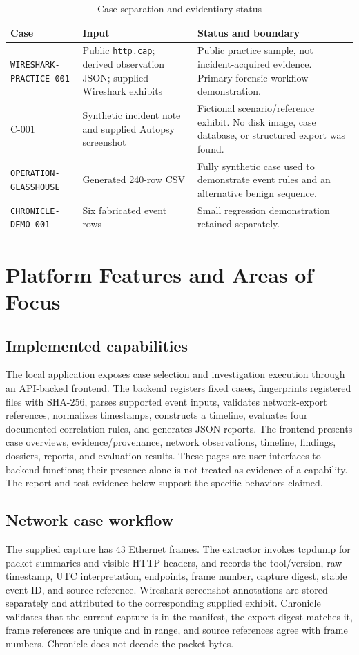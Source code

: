 \documentclass[12pt,a4paper]{report}
\newcommand{\caseid}[1]{\texttt{#1}}
\begin{document}
\begin{table}[H]
\centering
\caption{Case separation and evidentiary status}
\begin{tabularx}{\textwidth}{p{}p{}Y}
\toprule
Case & Input & Status and boundary\\
\midrule
\caseid{WIRESHARK-PRACTICE-001} & Public \texttt{http.cap}; derived observation JSON; supplied Wireshark exhibits & Public practice sample, not incident-acquired evidence. Primary forensic workflow demonstration.\\
C-001 & Synthetic incident note and supplied Autopsy screenshot & Fictional scenario/reference exhibit. No disk image, case database, or structured export was found.\\
\caseid{OPERATION-GLASSHOUSE} & Generated 240-row CSV & Fully synthetic case used to demonstrate event rules and an alternative benign sequence.\\
\caseid{CHRONICLE-DEMO-001} & Six fabricated event rows & Small regression demonstration retained separately.\\
\bottomrule
\end{tabularx}
\end{table}

\chapter{Platform Features and Areas of Focus}
\section{Implemented capabilities}
The local application exposes case selection and investigation execution through an API-backed frontend. The backend registers fixed cases, fingerprints registered files with SHA-256, parses supported event inputs, validates network-export references, normalizes timestamps, constructs a timeline, evaluates four documented correlation rules, and generates JSON reports. The frontend presents case overviews, evidence/provenance, network observations, timeline, findings, dossiers, reports, and evaluation results. These pages are user interfaces to backend functions; their presence alone is not treated as evidence of a capability. The report and test evidence below support the specific behaviors claimed.

\section{Network case workflow}
The supplied capture has 43 Ethernet frames. The extractor invokes tcpdump for packet summaries and visible HTTP headers, and records the tool/version, raw timestamp, UTC interpretation, endpoints, frame number, capture digest, stable event ID, and source reference. Wireshark screenshot annotations are stored separately and attributed to the corresponding supplied exhibit. Chronicle validates that the current capture is in the manifest, the export digest matches it, frame references are unique and in range, and source references agree with frame numbers. Chronicle does not decode the packet bytes.
\end{document}
